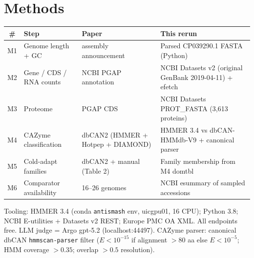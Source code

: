 \documentclass[11pt]{article}
\begin{document}
\section{Methods}
\begin{longtable}{@{}clll@{}}
\toprule
\# & Step & Paper & This rerun \\
\midrule
M1 & Genome length + GC        & assembly announcement       & Parsed CP039290.1 FASTA (Python) \\
M2 & Gene / CDS / RNA counts   & NCBI PGAP annotation        & NCBI Datasets v2 (original GenBank 2019-04-11) + efetch \\
M3 & Proteome                  & PGAP CDS                    & NCBI Datasets PROT\_FASTA (3{,}613 proteins) \\
M4 & CAZyme classification     & dbCAN2 (HMMER + Hotpep + DIAMOND) & HMMER 3.4 vs dbCAN-HMMdb-V9 + canonical parser \\
M5 & Cold-adapt families       & dbCAN2 + manual (Table 2)   & Family membership from M4 domtbl \\
M6 & Comparator availability   & 16--26 genomes              & NCBI esummary of sampled accessions \\
\bottomrule
\end{longtable}

Tooling: HMMER 3.4 (conda \texttt{antismash} env, uicgpu01, 16 CPU); Python 3.8; NCBI E-utilities + Datasets v2 REST; Europe PMC OA XML. All endpoints free. LLM judge = Argo gpt-5.2 (localhost:44497). CAZyme parser: canonical dbCAN \texttt{hmmscan-parser} filter ($E<10^{-15}$ if alignment $>80$ aa else $E<10^{-5}$; HMM coverage $>0.35$; overlap $>0.5$ resolution).
\end{document}
